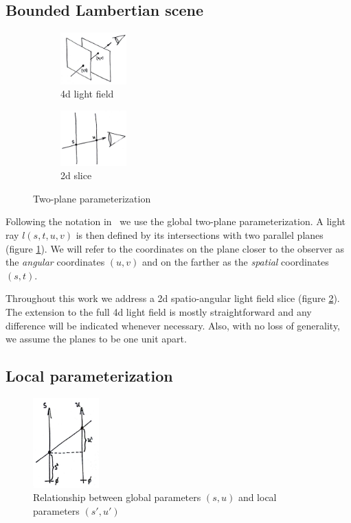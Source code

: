 \documentclass[acmtog,review,anonymous]{acmart}
\begin{document}
\subsection{Bounded Lambertian scene}

\begin{figure}[h]
  \centering
  \begin{subfigure}[t]{1in}
    \centering
    \includegraphics[width=1in]{figures/4dlf}
    \caption{4d light field}\label{fig:4dlf}
  \end{subfigure}
  \quad
  \begin{subfigure}[t]{1in}
    \centering
    \includegraphics[width=1in]{figures/2dslice}
    \caption{2d slice}\label{fig:2dslice}
  \end{subfigure}
  \caption{Two-plane parameterization}\label{fig:globalparam}
\end{figure}

Following the notation in~\cite{Levoy:1996:LFR:237170.237199,Gortler:1996:LUM:237170.237200} we use the global two-plane parameterization. A light ray $l(s, t, u, v)$ is then defined by its intersections with two parallel planes (figure \ref{fig:4dlf}). We will refer to the coordinates on the plane closer to the observer as the \emph{angular} coordinates $(u, v)$ and on the farther as the \emph{spatial} coordinates $(s, t)$.

Throughout this work we address a 2d spatio-angular light field slice (figure \ref{fig:2dslice}). The extension to the full 4d light field is mostly straightforward and any difference will be indicated whenever necessary. Also, with no loss of generality, we assume the planes to be one unit apart.

\subsection{Local parameterization}

\begin{figure}[h]
  \includegraphics[width=1in]{figures/localparam}
  \caption{Relationship between global parameters $(s, u)$ and local parameters $(s', u')$}
  \label{fig:localparam}
\end{figure}
\end{document}
